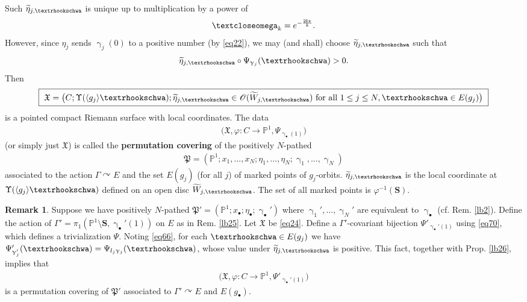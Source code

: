 \documentclass[12pt,a4paper,notitlepage]{article}
\theoremstyle{definition}
\newtheorem{rem}[df]{Remark}
\theoremstyle{plain}
\newcommand{\fk}{\mathfrak}
\newcommand{\wtd}{\widetilde}
\newcommand{\bk}[1]{\langle {#1}\rangle}
\newcommand{\scr}{\mathscr}
\newcommand{\im}{\mathbf{i}}
\newcommand{\blt}{\bullet}
\newcommand{\Pbb}{\mathbb P}
\newcommand{\Sbf}{\mathbf{S}}
\newcommand{\tipaomega}{\text{\textcloseomega}}
\newcommand{\tipae}{\text{\textrhookschwa}}
\numberwithin{equation}{subsection}
\begin{document}
Such $\wtd\eta_{j,\tipae}$ is unique up to multiplication by a power of \index{zz@$\tipaomega_k=e^{-\frac{2\im\pi}k}$}
\begin{align}
	\tipaomega_k=e^{-\frac{2\im\pi}k}.	
\end{align}
However, since $\eta_j$ sends $\upgamma_j(0)$ to a positive number (by \eqref{eq22}), we may (and shall) choose $\wtd\eta_{j,\tipae}$ such that
\begin{align}
	\wtd\eta_{j,\tipae}\circ\Psi_{\upgamma_j}(\tipae)>0.	\label{eq28}
\end{align}
Then
\begin{align}
	\boxed{~\fk X=	\big(C;\Upsilon(\bk{g_j}\tipae);\wtd\eta_{j,\tipae}\in\scr O(\wtd W_{j,\tipae})\text{ for all }1\leq j\leq N,\tipae\in E(g_j)\big)~}\label{eq24}
\end{align}
is a pointed compact Riemann surface with local coordinates. The data
\begin{align*}
\big(\fk X,\varphi:C\rightarrow\Pbb^1,\Psi_{\upgamma_\blt(1)}\big)	
\end{align*}
(or simply just $\fk X$) is  called the \textbf{permutation covering} of the positively $N$-pathed 
\begin{align*}
	\boxed{~\fk P=(\Pbb^1;x_1,\dots,x_N;\eta_1,\dots,\eta_N;\upgamma_1,\dots,\upgamma_N)~}
\end{align*}
associated to the action $\Gamma\curvearrowright E$ and the set  $E(g_j)$ (for all $j$) of marked points of $g_j$-orbits. $\wtd\eta_{j,\tipae}$ is the local coordinate at $\Upsilon(\bk{g_j}\tipae)$ defined on an open disc $\wtd W_{j,\tipae}$. The set of all marked points is $\varphi^{-1}(\Sbf)$.



\begin{rem}\label{lb27}
Suppose we have positively $N$-pathed $\fk P'=(\Pbb^1;x_\blt;\eta_\blt;\upgamma_\blt')$ where $\upgamma_1',\dots,\upgamma_N'$ are equivalent to $\upgamma_\blt$ (cf. Rem. \ref{lb2}). Define the action of $\Gamma'=\pi_1(\Pbb^1\setminus\Sbf,\upgamma_\blt'(1))$ on $E$ as in  Rem. \ref{lb25}. Let $\fk X$ be \eqref{eq24}. Define a $\Gamma'$-covariant bijection $\Psi'_{\upgamma_\blt'(1)}$ using \eqref{eq70}, which defines a trivialization $\Psi$. Noting \eqref{eq66}, for each $\tipae\in E(g_j)$ we have $\Psi'_{\upgamma_j'}(\tipae)=\Psi_{l_j\upgamma_j}(\tipae)$, whose value under $\wtd\eta_{j,\tipae}$ is positive. This fact, together with Prop. \ref{lb26}, implies that
\begin{align*}
\big(\fk X,\varphi:C\rightarrow\Pbb^1,\Psi'_{\upgamma_\blt'(1)}\big)
\end{align*}
is a permutation covering of $\fk P'$ associated to $\Gamma'\curvearrowright E$ and $E(g_\blt)$. 
\end{rem}
\end{document}
